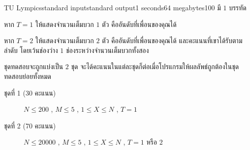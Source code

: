 \documentclass[11pt,a4paper]{article}
\begin{document}
\begin{problem}{TU Lympics}{standard input}{standard output}{1 seconds}{64 megabytes}{100}
\OutputFile
มี $1$ บรรทัด 

หาก $T = 1$ ให้แสดงจำนวนเต็มบวก $1$ ตัว คืออันดับที่เพื่อนของคุณได้ 

หาก $T = 2$ ให้แสดงจำนวนเต็มบวก $2$ ตัว คืออันดับที่เพื่อนของคุณได้ และคะแนนที่เขาได้รับตามลำดับ โดยเว้นช่องว่าง $1$ ช่องระหว่างจำนวนเต็มบวกทั้งสอง

\Scoring
ชุดทดสอบจะถูกแบ่งเป็น $2$ ชุด จะได้คะแนนในแต่ละชุดก็ต่อเมื่อโปรแกรมให้ผลลัพธ์ถูกต้องในชุดทดสอบย่อยทั้งหมด

\begin{description}

\item[ชุดที่ 1 (30 คะแนน)]  $N \leq 200$ , $M \leq 5$ , $1 \leq X \leq N$ , $T=1$

\item[ชุดที่ 2 (70 คะแนน)]  $N\leq20000$  , $M\leq5$ , $1 \leq X \leq N $ , $T=1$ หรือ $2$

\end{description}

\Examples

\begin{example}
%
%
\end{example}

\end{problem}
\end{document}
